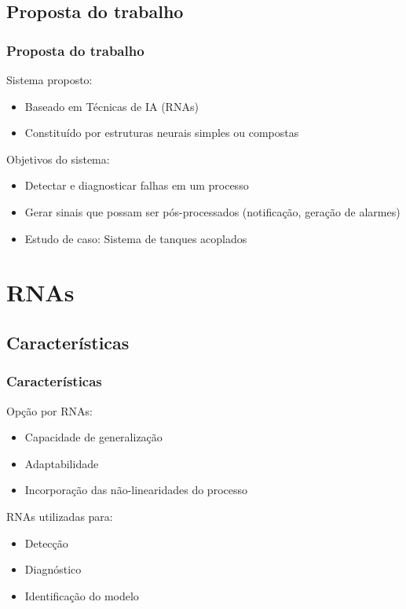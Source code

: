 \documentclass{beamer}
\begin{document}
\subsection{Proposta do trabalho}
\begin{frame}
    \frametitle{Proposta do trabalho}

    Sistema proposto:

\begin{itemize}
    \item Baseado em Técnicas de IA (RNAs)
    \item Constituído por estruturas neurais simples ou compostas
\end{itemize}

    Objetivos do sistema:

\begin{itemize}
    \item Detectar e diagnosticar falhas em um processo
    \item Gerar sinais que possam ser pós-processados (notificação, geração de
          alarmes)
    \item Estudo de caso: Sistema de tanques acoplados
\end{itemize}

\end{frame}

\section{RNAs}
\subsection{Características}
\begin{frame}
    \frametitle{Características}

    Opção por RNAs:

\begin{itemize}
    \item Capacidade de generalização
    \item Adaptabilidade
    \item Incorporação das não-linearidades do processo
\end{itemize}
    
    RNAs utilizadas para:

\begin{itemize}
    \item Detecção
    \item Diagnóstico
    \item Identificação do modelo
\end{itemize}
\end{frame}
\end{document}
